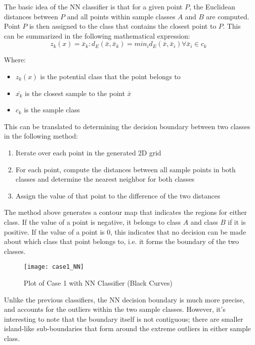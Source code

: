 \documentclass{article}
\begin{document}
The basic idea of the NN classifier is that for a given point $P$, the Euclidean distances between $P$ and all points within sample classes $A$ and $B$ are computed. Point $P$ is then assigned to the class that contains the closest point to $P$. This can be summarized in the following mathematical expression:
\begin{equation}
    z_k(x) = \bar{x}_k : d_E(\bar{x}, \bar{x}_k) = min_id_E(\bar{x}, \bar{x}_i) \forall\bar{x}_i \in c_k
\end{equation}

Where:
\begin{itemize}
    \item{$z_k(x)$ is the potential class that the point belongs to}
    \item{$\bar{x_k}$ is the closest sample to the point $\bar{x}$}
    \item{$c_k$ is the sample class}
\end{itemize}

This can be translated to determining the decision boundary between two classes in the following method:
\begin{enumerate}
    \item{Iterate over each point in the generated 2D grid}
    \item{For each point, compute the distances between all sample points in both classes and determine the nearest neighbor for both classes}
    \item{Assign the value of that point to the difference of the two distances}
\end{enumerate}

The method above generates a contour map that indicates the regions for either class. If the value of a point is negative, it belongs to class $A$ and class $B$ if it is positive. If the value of a point is 0, this indicates that no decision can be made about which class that point belongs to, i.e. it forms the boundary of the two classes.

\begin{figure}[H]
\caption{Plot of Case 1 with NN Classifier (Black Curves)}
\centering
\texttt{[image: case1\_NN]}
\label{fig:Case1_NN}
\end{figure}

Unlike the previous classifiers, the NN decision boundary is much more precise, and accounts for the outliers within the two sample classes. However, it's interesting to note that the boundary itself is not contiguous; there are smaller island-like sub-boundaries that form around the extreme outliers in either sample class.
\end{document}
